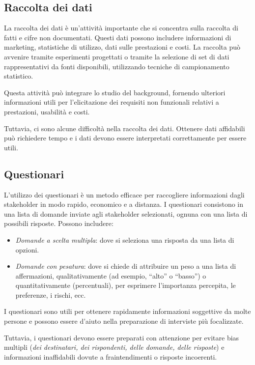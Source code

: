 \subsection{Raccolta dei dati}

La raccolta dei dati è un'attività importante che si concentra sulla raccolta
di fatti e cifre non documentati. Questi dati possono includere informazioni
di marketing, statistiche di utilizzo, dati sulle prestazioni e costi. La
raccolta può avvenire tramite esperimenti progettati o tramite la selezione
di set di dati rappresentativi da fonti disponibili, utilizzando tecniche di
campionamento statistico.

Questa attività può integrare lo studio del background, fornendo ulteriori
informazioni utili per l'elicitazione dei requisiti non funzionali relativi
a prestazioni, usabilità e costi.

Tuttavia, ci sono alcune difficoltà nella raccolta dei dati. Ottenere dati
affidabili può richiedere tempo e i dati devono essere interpretati
correttamente per essere utili.
\subsection{Questionari}

L'utilizzo dei questionari è un metodo efficace per raccogliere informazioni
dagli stakeholder in modo rapido, economico e a distanza. I questionari
consistono in una lista di domande inviate agli stakeholder selezionati,
ognuna con una lista di possibili risposte. Possono includere:

\begin{itemize}
    \item \textit{Domande a scelta multipla}: dove si seleziona una risposta
    da una lista di opzioni.
    \item \textit{Domande con pesatura}: dove si chiede di attribuire un peso
    a una lista di affermazioni, qualitativamente (ad esempio, ``alto'' o ``basso'')
    o quantitativamente (percentuali), per esprimere l'importanza percepita,
    le preferenze, i rischi, ecc.
\end{itemize}

I questionari sono utili per ottenere rapidamente informazioni soggettive da
molte persone e possono essere d'aiuto nella preparazione di interviste più
focalizzate.

Tuttavia, i questionari devono essere preparati con attenzione per evitare
bias multipli (\textit{dei destinatari, dei rispondenti, delle domande, delle risposte})
e informazioni inaffidabili dovute a fraintendimenti o risposte incoerenti.

